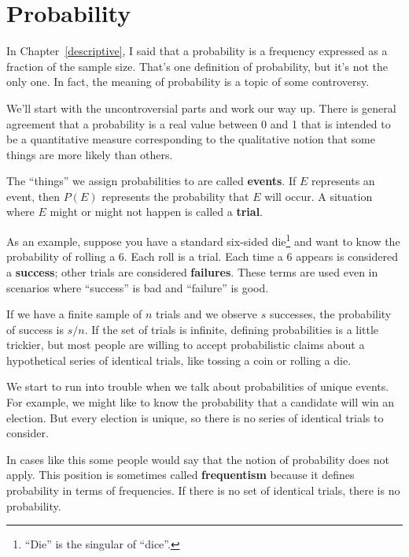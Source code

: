 \documentclass[12pt]{book}
\begin{document}
\chapter{Probability}
\label{probability}

In Chapter~\ref{descriptive}, I said that a probability is a frequency
expressed as a fraction of the sample size.  That's one definition of
probability, but it's not the only one.  In fact, the meaning
of probability is a topic of some controversy.

We'll start with the uncontroversial parts and work our way up.  There
is general agreement that a probability is a real value between 0 and
1 that is intended to be a quantitative measure corresponding to the
qualitative notion that some things are more likely than others.


The ``things'' we assign probabilities to are called {\bf events}.  If
$E$ represents an event, then $P(E)$ represents the probability that
$E$ will occur.  A situation where $E$ might or might not happen is
called a {\bf trial}.


As an example, suppose you have a standard six-sided
die\footnote{``Die'' is the singular of ``dice''.} and want to know
the probability of rolling a 6.  Each roll is a trial.
Each time a 6 appears is considered a {\bf success}; other trials are
considered {\bf failures}.  These terms are used even in scenarios
where ``success'' is bad and ``failure'' is good.

If we have a finite sample of $n$ trials and we observe $s$ successes,
the probability of success is $s/n$.  If the set of trials is
infinite, defining probabilities is a little trickier, but most people
are willing to accept probabilistic claims about a hypothetical series
of identical trials, like tossing a coin or rolling a die.


We start to run into trouble when we talk about probabilities of
unique events.  For example, we might like to know the probability
that a candidate will win an election.  But every election is unique,
so there is no series of identical trials to consider.


In cases like this some people would say that the notion of
probability does not apply.  This position is sometimes called {\bf
  frequentism} because it defines probability in terms of frequencies.
If there is no set of identical trials, there is no probability.
\end{document}

